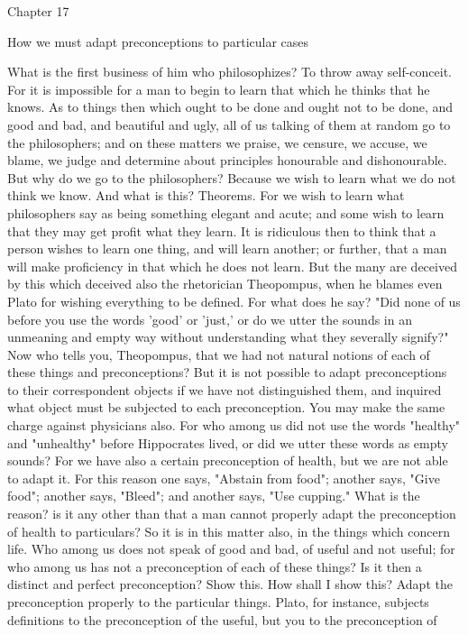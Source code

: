 \documentclass[a4paper]{article}
\begin{document}
Chapter 17

How we must adapt preconceptions to particular cases

    What is the first business of him who philosophizes? To throw away
self-conceit. For it is impossible for a man to begin to learn that which he
thinks that he knows. As to things then which ought to be done and ought not to
be done, and good and bad, and beautiful and ugly, all of us talking of them at
random go to the philosophers; and on these matters we praise, we censure, we
accuse, we blame, we judge and determine about principles honourable and
dishonourable. But why do we go to the philosophers? Because we wish to learn
what we do not think we know. And what is this? Theorems. For we wish to learn
what philosophers say as being something elegant and acute; and some wish to
learn that they may get profit what they learn. It is ridiculous then to think
that a person wishes to learn one thing, and will learn another; or further,
that a man will make proficiency in that which he does not learn. But the many
are deceived by this which deceived also the rhetorician Theopompus, when he
blames even Plato for wishing everything to be defined. For what does he say?
"Did none of us before you use the words 'good' or 'just,' or do we utter the
sounds in an unmeaning and empty way without understanding what they severally
signify?" Now who tells you, Theopompus, that we had not natural notions of
each of these things and preconceptions? But it is not possible to adapt
preconceptions to their correspondent objects if we have not distinguished
them, and inquired what object must be subjected to each preconception. You may
make the same charge against physicians also. For who among us did not use the
words "healthy" and "unhealthy" before Hippocrates lived, or did we utter these
words as empty sounds? For we have also a certain preconception of health, but
we are not able to adapt it. For this reason one says, "Abstain from food";
another says, "Give food"; another says, "Bleed"; and another says, "Use
cupping." What is the reason? is it any other than that a man cannot properly
adapt the preconception of health to particulars?
    So it is in this matter also, in the things which concern life. Who among
us does not speak of good and bad, of useful and not useful; for who among us
has not a preconception of each of these things? Is it then a distinct and
perfect preconception? Show this. How shall I show this? Adapt the
preconception properly to the particular things. Plato, for instance, subjects
definitions to the preconception of the useful, but you to the preconception of
\end{document}
